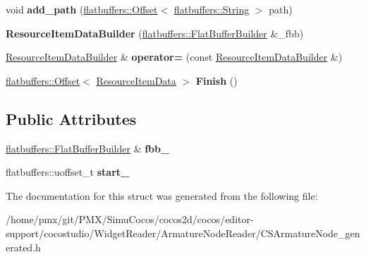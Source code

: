 \begin{DoxyCompactItemize}
void {\bfseries add\+\_\+path} (\hyperlink{structflatbuffers_1_1Offset}{flatbuffers\+::\+Offset}$<$ \hyperlink{structflatbuffers_1_1String}{flatbuffers\+::\+String} $>$ path)
\item 
\mbox{\label{structflatbuffers_1_1ResourceItemDataBuilder_a0b60fc6e10179398c04f597df7c17173}} 
{\bfseries Resource\+Item\+Data\+Builder} (\hyperlink{classflatbuffers_1_1FlatBufferBuilder}{flatbuffers\+::\+Flat\+Buffer\+Builder} \&\+\_\+fbb)
\item 
\mbox{\label{structflatbuffers_1_1ResourceItemDataBuilder_ae418fedf1c4561d808053467f2884395}} 
\hyperlink{structflatbuffers_1_1ResourceItemDataBuilder}{Resource\+Item\+Data\+Builder} \& {\bfseries operator=} (const \hyperlink{structflatbuffers_1_1ResourceItemDataBuilder}{Resource\+Item\+Data\+Builder} \&)
\item 
\mbox{\label{structflatbuffers_1_1ResourceItemDataBuilder_aba266cd978d7113b9c8fa7a6ae0517af}} 
\hyperlink{structflatbuffers_1_1Offset}{flatbuffers\+::\+Offset}$<$ \hyperlink{structflatbuffers_1_1ResourceItemData}{Resource\+Item\+Data} $>$ {\bfseries Finish} ()
\end{DoxyCompactItemize}
\subsection*{Public Attributes}
\begin{DoxyCompactItemize}
\item 
\mbox{\label{structflatbuffers_1_1ResourceItemDataBuilder_ae58f29b683538e069775ca13c58d1373}} 
\hyperlink{classflatbuffers_1_1FlatBufferBuilder}{flatbuffers\+::\+Flat\+Buffer\+Builder} \& {\bfseries fbb\+\_\+}
\item 
\mbox{\label{structflatbuffers_1_1ResourceItemDataBuilder_a9d6b8fd684bd1ebb185f0f386643bcfe}} 
flatbuffers\+::uoffset\+\_\+t {\bfseries start\+\_\+}
\end{DoxyCompactItemize}


The documentation for this struct was generated from the following file\+:\begin{DoxyCompactItemize}
\item 
/home/pmx/git/\+P\+M\+X/\+Simu\+Cocos/cocos2d/cocos/editor-\/support/cocostudio/\+Widget\+Reader/\+Armature\+Node\+Reader/C\+S\+Armature\+Node\+\_\+generated.\+h\end{DoxyCompactItemize}

